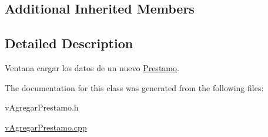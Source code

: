 \subsection*{Additional Inherited Members}


\subsection{Detailed Description}
Ventana cargar los datos de un nuevo \hyperlink{class_prestamo}{Prestamo}. 

The documentation for this class was generated from the following files\+:\begin{DoxyCompactItemize}
\item 
v\+Agregar\+Prestamo.\+h\item 
\hyperlink{v_agregar_prestamo_8cpp}{v\+Agregar\+Prestamo.\+cpp}\end{DoxyCompactItemize}
